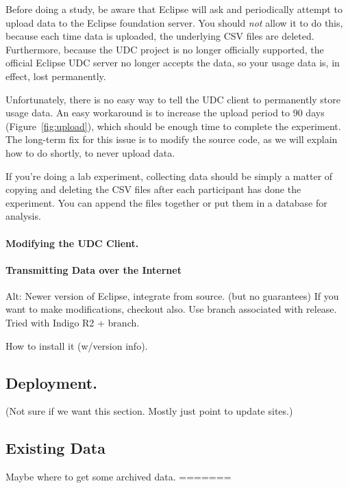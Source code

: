 Before doing a study, be aware that Eclipse will ask and periodically attempt to upload
data to the Eclipse foundation server.
You should \emph{not} allow it to do this, because each time data is uploaded, the underlying
CSV files are deleted.
Furthermore, because the UDC project is no longer officially supported, the official Eclipse
UDC server no longer accepts the data, so your usage data is, in effect, lost permanently.

Unfortunately, there is no easy way to tell the UDC client to permanently store
usage data.
An easy workaround is to increase the upload period to 90 days (Figure~\ref{fig:upload}),
which should be enough time to complete the experiment.
The long-term fix for this issue is to modify the source code, as we will explain
how to do shortly, to never upload data.

If you're doing a lab experiment, collecting data should be simply a matter of 
copying and deleting the CSV files after each participant has done the experiment.
You can append the files together or put them in a database for analysis.

\paragraph{Modifying the UDC Client.}

\paragraph{Transmitting Data over the Internet}


Alt:
Newer version of Eclipse, integrate from source. (but no guarantees)
If you want to make modifications, checkout also. Use branch associated with release. 
Tried with Indigo R2 + branch.

How to install it (w/version info). 

\subsection{Deployment.}

(Not sure if we want this section. Mostly just point to update sites.)

\subsection{Existing Data}

Maybe where to get some archived data. 
=======

